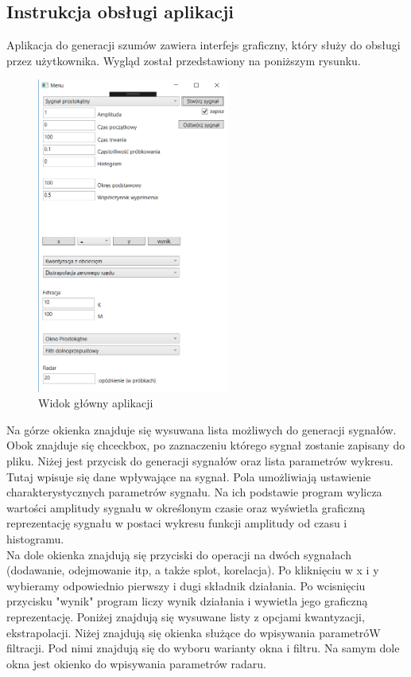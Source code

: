 \documentclass[12pt]{article}
\begin{document}
\subsection{Instrukcja obsługi aplikacji}
Aplikacja do generacji szumów zawiera interfejs graficzny, który służy do obsługi przez użytkownika. Wygląd został przedstawiony na poniższym rysunku.
\begin{figure}[h!]
 \centering
 \includegraphics[width=6.3cm]{ui1.PNG}
 \vspace{-0.3cm}
 \caption{Widok główny aplikacji}
 \label{Widok_aplikacjis}
\end{figure}

Na górze okienka znajduje się wysuwana lista możliwych do generacji sygnałów. Obok znajduje się chceckbox, po zaznaczeniu którego sygnał zostanie zapisany do pliku.
Niżej jest przycisk do generacji sygnałów oraz lista parametrów wykresu. Tutaj wpisuje się dane wpływające na sygnał.
Pola umożliwiają ustawienie charakterystycznych parametrów sygnału. Na ich podstawie program wylicza wartości amplitudy sygnału w określonym czasie oraz wyświetla graficzną reprezentację sygnału w postaci wykresu funkcji amplitudy od czasu i histogramu.\\

Na dole okienka znajdują się przyciski do operacji na dwóch sygnałach (dodawanie, odejmowanie itp, a także splot, korelacja). Po kliknięciu w x i y wybieramy odpowiednio pierwszy i dugi składnik działania. Po wcisnięciu przycisku "wynik" program liczy wynik działania i wywietla jego graficzną reprezentację. 
Poniżej znajdują się wysuwane listy z opcjami kwantyzacji, ekstrapolacji. Niżej znajdują się okienka służące do wpisywania parametróW filtracji. Pod nimi znajdują się do wyboru warianty okna i filtru.
Na samym dole okna jest okienko do wpisywania parametrów radaru. 
\end{document}
